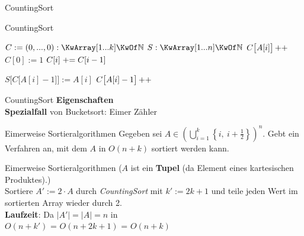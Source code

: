 \begin{frame}{CountingSort}
	\begin{exampleblock}{CountingSort}
		\begin{algorithm}[H]
			\small
			 {
				$C := (0,...,0) : \KwArray[1...k] \KwOf \N$  \;
				$S : \KwArray[1...n] \KwOf \N$  \;
				 {
					$C\big[A[i]\big]\operatorname{++}$\;
				}
				$C[0] := 1$\;
				 {
					$C[i] \mathrel{+}= C[i-1]$\;
				}
				
				 {
					$S\Big[C\big[A[i]-1\big]\Big] := A[i]$   \;
					$C\big[A[i]-1\big]\operatorname{++}$ 
				}
			}
		\end{algorithm}
	\end{exampleblock}
\end{frame}

\begin{frame}{CountingSort}
	\textbf{Eigenschaften}  \\
	\impl \textbf{Spezialfall} von Bucketsort: Eimer \entspr Zähler \\
	\pause
	\QuestionVspace
\end{frame}

\begin{frame}{Eimerweise Sortieralgorithmen}
	Gegeben sei $ A \in \left( \bigcup\limits_{i=1}^{k} \left\lbrace i,\ i+\frac{1}{2} \right\rbrace\right)^{\!n}$. Gebt ein Verfahren an, mit dem $A$ in $O(n + k)$ sortiert werden kann. 
\end{frame}

\begin{frame}{Eimerweise Sortieralgorithmen}
	\solutionheading
	($A$ ist ein \textbf{Tupel} (da Element eines kartesischen Produktes).) \\
	Sortiere $A' := 2 \cdot A$ durch \emph{CountingSort} mit $k' := 2k+1$ und teile jeden Wert im sortierten Array wieder durch 2. \\
	\textbf{Laufzeit}: Da $|A'| = |A| = n$ in \\ 
	$O(n + k')$ = $O(n + 2k+1)$ = $O(n + k)$ 
\end{frame}



